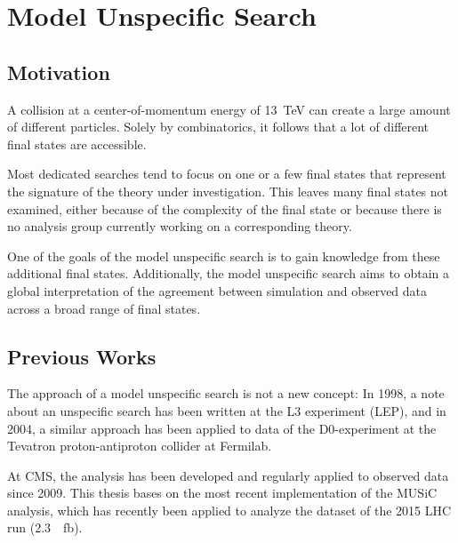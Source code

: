 
\chapter{Model Unspecific Search}

\section{Motivation}
A collision at a center-of-momentum energy of \SI{13}{\TeV} can create a large amount of different particles. Solely by combinatorics, it follows that a lot of different final states are accessible.

Most dedicated searches tend to focus on one or a few final states that represent the signature of the theory under investigation. This leaves many final states not examined, either because of the complexity of the final state or because there is no analysis group currently working on a corresponding theory.

One of the goals of the model unspecific search is to gain knowledge from these additional final states. Additionally, the model unspecific search aims to obtain a global interpretation of the agreement between simulation and observed data across a broad range of final states.

\section{Previous Works}
The approach of a model unspecific search is not a new concept: In 1998, a note about an unspecific search has been written at the L3 experiment (\ac{LEP})\cite{Hebbeker:GlobalComparisonL3}, and in 2004, a similar approach has been applied to data of the D0-experiment at the Tevatron proton-antiproton collider at Fermilab\cite{Biallass:ModelIndependentSearch}.

At \ac{CMS}, the analysis has been developed and regularly applied to observed data since 2009\cite{Schmitz:ModelUnspecificSearch,Hof:ImplementationModelIndependent,Dietz-Laursonn:ModelUnspecificSearch,Olschewski:StudyAlternativeStatistical,Brodski:ModelUnspecificSearch,Pieta:MUSiCModelUnspecific,Papacz:ModelUnspecificSearch,Albert:ExtensionModelUnspecific,Roemer:ModelUnspecificSearch,CMS:CMS-PAS-EXO-14-016,Knutzen:softwarereinterpretationmodel,Durchardt:MUSiCModelUnspecific}. 
This thesis bases on the most recent implementation of the \ac{MUSiC} analysis, which has recently been applied to analyze the dataset of the 2015 \ac{LHC} run\cite{Roemer:ModelUnspecificSearch} (\SI{2.3}{\per\femto\barn}).

